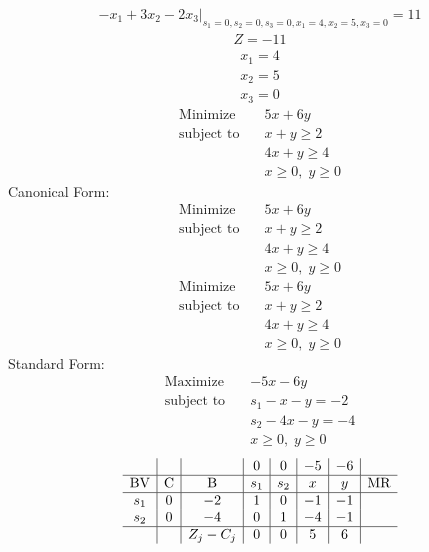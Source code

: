 \documentclass{article}
\begin{document}
\begin{align*}
\left.-x_{1} + 3x_{2} - 2x_{3}\right|_{s_{1}=0,s_{2}=0,s_{3}=0,x_{1}=4,x_{2}=5,x_{3}=0}=11\end{align*}
\begin{align*}
Z=-11\end{align*}
\begin{align*}
x_{1}=4\end{align*}
\begin{align*}
x_{2}=5\end{align*}
\begin{align*}
x_{3}=0\end{align*}
\begin{align*}
\text{Minimize} \quad & 5x + 6y\\
\text{subject to} \quad
& x + y\ge2\\
& 4x + y\ge4\\
& x\ge0,\; y\ge0\end{align*}
Canonical Form:\\
\begin{align*}
\text{Minimize} \quad & 5x + 6y\\
\text{subject to} \quad
& x + y\ge2\\
& 4x + y\ge4\\
& x\ge0,\; y\ge0\end{align*}
\begin{align*}
\text{Minimize} \quad & 5x + 6y\\
\text{subject to} \quad
& x + y\ge2\\
& 4x + y\ge4\\
& x\ge0,\; y\ge0\end{align*}
Standard Form:\\
\begin{align*}
\text{Maximize} \quad & -5x - 6y\\
\text{subject to} \quad
& s_{1} - x - y=-2\\
& s_{2} - 4x - y=-4\\
& x\ge0,\; y\ge0\end{align*}
\begin{align*}
\begin{array}{c|c|c|c|c|c|c|c}
 &  &  & 0 & 0 & -5 & -6 & \\
\hline
\text{BV} & \text{C} & \text{B} & s_{1} & s_{2} & x & y & \text{MR} \\
\hline
s_{1} & 0 & -2 & 1 & 0 & -1 & -1 \\
s_{2} & 0 & -4 & 0 & 1 & -4 & -1 \\
\hline
 &  & Z_j-C_j & 0 & 0 & 5 & 6 & \\
\end{array}
\end{align*}
\end{document}
